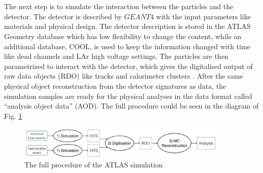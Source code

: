 \\
\\The next step is to simulate the interaction between the particles and the detector. The detector is described by $GEANT4$\cite{Agostinelli:2002hh} with the input parameters like materials and physical design. The detector description is stored in the ATLAS Geometry database which has low flexibility to change the content, while an additional database, COOL, is used to keep the information changed with time like dead channels and LAr high voltage settings. The particles are then parametrized to interact with the detector, which gives the digitalised output of raw data objects (RDO) like tracks and calorimeter clusters . After the same physical object reconstruction from the detector signatures as data, the simulation samples are ready for the physical analyses in the data format called ``analysis object data'' (AOD). The full procedure could be seen in the diagram of Fig. \ref{Fig:simulation}
\begin{figure}[!h]                
	\includegraphics[width=0.9\textwidth]{Chapter2/simulation.png}
	\centering
	\begin{center}
		\caption{The full procedure of the ATLAS simulation}
		\label{Fig:simulation}            
	\end{center}
\end{figure}